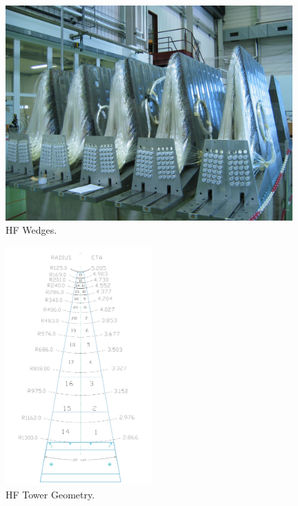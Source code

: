 		\begin{figure}[]
			\begin{center}
				\includegraphics[width=0.98\textwidth]{figures/Ch_4_raddam/HFQuartz.jpg}
				\caption{HF Wedges.}
				\label{figure:HFQuartz}
			\end{center}
		\end{figure}
		
		\begin{figure}[]
			\begin{center}
				\includegraphics[width=0.5\textwidth]{figures/Ch_4_raddam/HFTowers.png}
				\caption{HF Tower Geometry.}
				\label{figure:HFTower}
			\end{center}
		\end{figure}
		
